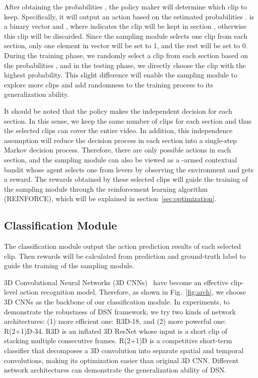 \documentclass[journal]{IEEEtran}
\begin{document}
After obtaining the probabilities , the policy maker will determine which clip to keep.
Specifically, it will output an action  based on the estimated probabilities .  is a binary vector and , where  indicates the  clip will be kept in section , otherwise this clip will be discarded.
Since the sampling module selects one clip from each section, only one element in vector  will be set to 1, and the rest will be set to 0.
During the training phase, we randomly select a clip from each section based on the probabilities , and in the testing phase, we directly choose the clip with the highest probability.
This slight difference will enable the sampling module to explore more clips and add randomness to the training process to its generalization ability.

It should be noted that the policy makes the independent decision for each section. In this sense, we keep the same number of clips for each section and thus the selected clips can cover the entire video. In addition, this independence assumption will reduce the decision process in each section into a single-step Markov decision process. Therefore, there are only  possible actions in each section, and the sampling module can also be viewed as a -armed contextual bandit whose agent selects one from  levers by observing the environment and gets a reward.
The rewards obtained by these selected  clips will guide the training of the sampling module through the reinforcement learning algorithm (REINFORCE), which will be explained in section~\ref{sec:optimization}.


\subsection{Classification Module}
\label{sec:classification}

The classification module output the action prediction results of each selected clip.
Then rewards will be calculated from prediction and ground-truth label to guide the training of the sampling module.

3D Convolutional Neural Networks (3D CNNs)~\cite{TranBFTP15,R2+1D} have become an effective clip-level action recognition model.
Therefore, as shown in Fig.~\ref{fig:arch}, we choose 3D CNNs as the backbone of our classification module.
In experiments, to demonstrate the robustness of DSN framework, we try two kinds of network architectures: (1) more efficient one: R3D-18, and (2) more powerful one: R(2+1)D-34.
R3D is an inflated 3D ResNet whose input is a short clip of stacking multiple consecutive frames.
R(2+1)D is a competitive short-term classifier that decomposes a 3D convolution into separate spatial and temporal convolutions, making its optimization easier than original 3D CNN.
Different network architectures can demonstrate the generalization ability of DSN.
\end{document}

